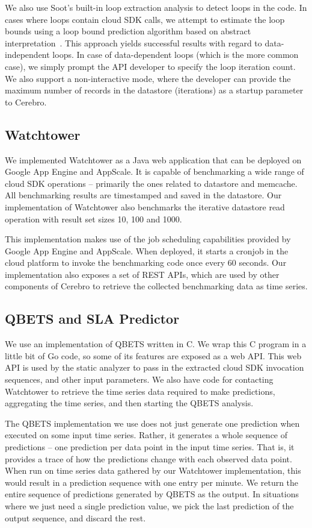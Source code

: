 We also use Soot's built-in loop extraction analysis
to detect loops in the code. In cases where loops contain cloud SDK calls, we attempt to estimate
the loop bounds using a loop bound prediction algorithm based on abstract interpretation~\cite{bygde2010static}. This
approach yields successful results with regard to data-independent loops. In case of data-dependent
loops (which is the more common case), we simply prompt the API developer to specify the loop iteration
count. We also support a non-interactive mode, where the developer can provide the maximum number of
records in the datastore (iterations) as a startup parameter to Cerebro.%

\subsection{Watchtower}
We implemented Watchtower as a Java web application that can be deployed on Google App Engine and
AppScale. It is capable of benchmarking a wide range of cloud SDK operations
-- primarily the ones related to datastore and memcache. All benchmarking results are timestamped and 
saved in the datastore. Our implementation of Watchtower also benchmarks the iterative datastore read operation
with result set sizes 10, 100 and 1000. 

This implementation makes use of the job scheduling capabilities provided by Google App
Engine and AppScale. When deployed, it starts a cronjob in the cloud platform to invoke the benchmarking code
once every 60 seconds. Our implementation also exposes a set of REST APIs, which
are used by other components of Cerebro to retrieve the collected benchmarking data as time series.

\subsection{QBETS and SLA Predictor}
We use an implementation of QBETS written in C. We wrap this C program in a little bit of Go code, so some 
of its features are exposed as a web API. This web API is used by the static analyzer to pass in the extracted
cloud SDK invocation sequences, and other input parameters. We also have code for contacting Watchtower 
to retrieve the time series data required to make predictions, aggregating the time series, and then 
starting the QBETS analysis. 

The QBETS implementation we use does not just generate one prediction when executed on
some input time series. Rather, it generates a whole sequence of predictions -- one prediction per data point in the input
time series. That is, it provides a trace of how the predictions change with each observed data point.
When run on time series data gathered by our Watchtower implementation,
this would result in a prediction sequence with one entry per minute.
We return the entire sequence of predictions generated by QBETS
as the output. In situations where we just need a single prediction value, we pick the last prediction of the output
sequence, and discard the rest.


